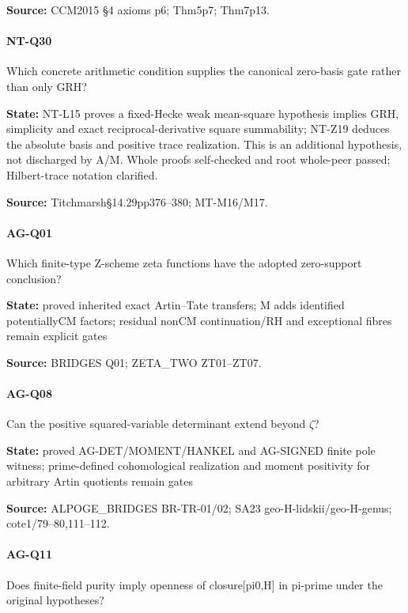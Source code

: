 \documentclass[11pt,a4paper]{article}
\begin{document}
\textbf{Source:} CCM2015 §4 axioms p6; Thm5p7; Thm7p13.

\paragraph{NT-Q30} Which concrete arithmetic condition supplies the canonical zero-basis gate rather than only GRH?

\textbf{State:} NT-L15 proves a fixed-Hecke weak mean-square hypothesis implies GRH, simplicity and exact reciprocal-derivative square summability; NT-Z19 deduces the absolute basis and positive trace realization.\allowbreak{} This is an additional hypothesis, not discharged by A/\allowbreak{}M.\allowbreak{} Whole proofs self-checked and root whole-peer passed; Hilbert-trace notation clarified.\allowbreak{}

\textbf{Source:} Titchmarsh§14.\allowbreak{}29pp376–\allowbreak{}380; MT-M16/\allowbreak{}M17.

\paragraph{AG-Q01} Which finite-type Z-scheme zeta functions have the adopted zero-support conclusion?

\textbf{State:} proved inherited exact Artin–\allowbreak{}Tate transfers; M adds identified potentiallyCM factors; residual nonCM continuation/\allowbreak{}RH and exceptional fibres remain explicit gates

\textbf{Source:} BRIDGES Q01; ZETA\_\allowbreak{}TWO ZT01–\allowbreak{}ZT07.

\paragraph{AG-Q08} Can the positive squared-variable determinant extend beyond \ensuremath{\zeta}?

\textbf{State:} proved AG-DET/\allowbreak{}MOMENT/\allowbreak{}HANKEL and AG-SIGNED finite pole witness; prime-defined cohomological realization and moment positivity for arbitrary Artin quotients remain gates

\textbf{Source:} ALPOGE\_\allowbreak{}BRIDGES BR-TR-01/\allowbreak{}02; SA23 geo-H-lidskii/\allowbreak{}geo-H-genus; cote1/\allowbreak{}79–\allowbreak{}80,111–\allowbreak{}112.

\paragraph{AG-Q11} Does finite-field purity imply openness of closure[pi0,H] in pi-prime under the original hypotheses?
\end{document}
